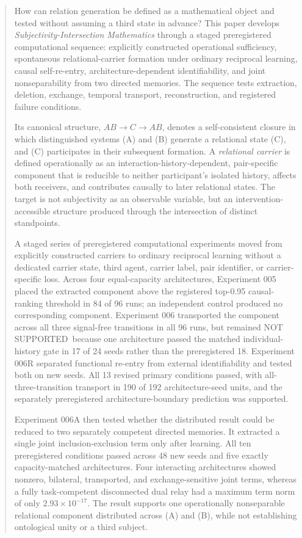 \documentclass[11pt,a4paper]{article}
\newcommand{\ABclosure}{\(AB \rightarrow C \rightarrow AB\)}
\newcommand{\statusnotsupported}{\textsf{NOT SUPPORTED}}
\begin{document}
\begin{abstract}
How can relation generation be defined as a mathematical object and tested without assuming a third state in advance? This paper develops \emph{Subjectivity-Intersection Mathematics} through a staged preregistered computational sequence: explicitly constructed operational sufficiency, spontaneous relational-carrier formation under ordinary reciprocal learning, causal self-re-entry, architecture-dependent identifiability, and joint nonseparability from two directed memories. The sequence tests extraction, deletion, exchange, temporal transport, reconstruction, and registered failure conditions.

Its canonical structure, \ABclosure, denotes a self-consistent closure in which distinguished systems (A) and (B) generate a relational state (C), and (C) participates in their subsequent formation. A \emph{relational carrier} is defined operationally as an interaction-history-dependent, pair-specific component that is reducible to neither participant's isolated history, affects both receivers, and contributes causally to later relational states. The target is not subjectivity as an observable variable, but an intervention-accessible structure produced through the intersection of distinct standpoints.

A staged series of preregistered computational experiments moved from explicitly constructed carriers to ordinary reciprocal learning without a dedicated carrier state, third agent, carrier label, pair identifier, or carrier-specific loss. Across four equal-capacity architectures, Experiment 005 placed the extracted component above the registered top-0.95 causal-ranking threshold in 84 of 96 runs; an independent control produced no corresponding component. Experiment 006 transported the component across all three signal-free transitions in all 96 runs, but remained \statusnotsupported\ because one architecture passed the matched individual-history gate in 17 of 24 seeds rather than the preregistered 18. Experiment 006R separated functional re-entry from external identifiability and tested both on new seeds. All 13 revised primary conditions passed, with all-three-transition transport in 190 of 192 architecture-seed units, and the separately preregistered architecture-boundary prediction was supported.

Experiment 006A then tested whether the distributed result could be reduced to two separately competent directed memories. It extracted a single joint inclusion-exclusion term only after learning. All ten preregistered conditions passed across 48 new seeds and five exactly capacity-matched architectures. Four interacting architectures showed nonzero, bilateral, transported, and exchange-sensitive joint terms, whereas a fully task-competent disconnected dual relay had a maximum term norm of only $2.93\times10^{-17}$. The result supports one operationally nonseparable relational component distributed across (A) and (B), while not establishing ontological unity or a third subject.


\end{abstract}
\end{document}
